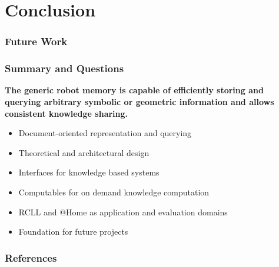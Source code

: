 \section{Conclusion}
\begin{frame}
  \frametitle{Future Work}
\end{frame}
\begin{frame}
  \frametitle{Summary and Questions}
  \begin{block}{} \centering\bfseries The generic robot memory is capable of
    efficiently storing and querying arbitrary symbolic or geometric information
    and allows consistent knowledge sharing.
  \end{block}

  \bigskip

  \begin{itemize}
  \item Document-oriented representation and querying
  \item Theoretical and architectural design
  \item Interfaces for knowledge based systems
  \item Computables for on demand knowledge computation
  \item RCLL and @Home as application and evaluation domains
  \item Foundation for future projects
  \end{itemize}
\end{frame}






\begin{frame}[allowframebreaks]
  \frametitle{References}
  \small
  
  
\end{frame}


